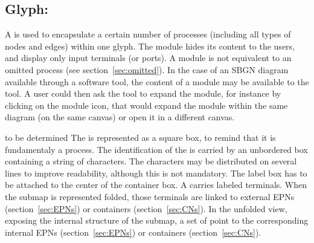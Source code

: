 \subsection{Glyph: }\label{sec:submap}

A  is used to encapsulate a certain number of processes (including all types of nodes and edges) within one glyph. The module hides its content to the users, and display only input terminals (or ports). A module is not equivalent to an omitted process (see section~\ref{sec:omitted}). In the case of an SBGN diagram available through a software tool, the content of a module may be available to the tool. A user could then ask the tool to expand the module, for instance by clicking on the module icon, that would expand the module within the same diagram (on the same canvas) or open it in a different canvas.

\begin{glyphDescription}
\glyphSboTerm to be determined
\glyphContainer The  is represented as a square box, to remind that it is fundamentaly a process.
\glyphLabel The identification of the  is carried by an unbordered box containing a string of
  characters. The characters may be distributed on several lines to improve readability, although this is not mandatory.  The label box has to be attached to the center of the container box.
\glyphAux A  carries labeled terminals. When the submap is represented folded, those terminals are linked to external EPNs (section~\ref{sec:EPNs}) or containers (section~\ref{sec:CNs}). In the unfolded view, exposing the internal structure of the submap, a set of  point to the corresponding internal EPNs (section~\ref{sec:EPNs}) or containers (section~\ref{sec:CNs}).
\end{glyphDescription}


